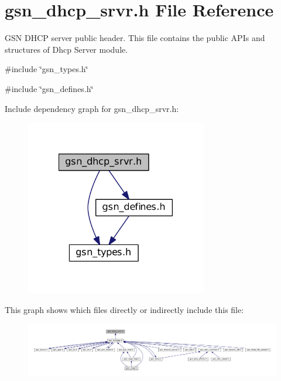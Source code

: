 \hypertarget{a00482}{
\section{gsn\_\-dhcp\_\-srvr.h File Reference}
\label{a00482}
}


GSN DHCP server public header. This file contains the public APIs and structures of Dhcp Server module.  


{\ttfamily \#include \char`\"{}gsn\_\-types.h\char`\"{}}\par
{\ttfamily \#include \char`\"{}gsn\_\-defines.h\char`\"{}}\par
Include dependency graph for gsn\_\-dhcp\_\-srvr.h:
\nopagebreak
\begin{figure}[H]
\begin{center}
\leavevmode
\includegraphics[width=225pt]{a00710}
\end{center}
\end{figure}
This graph shows which files directly or indirectly include this file:
\nopagebreak
\begin{figure}[H]
\begin{center}
\leavevmode
\includegraphics[width=400pt]{a00711}
\end{center}
\end{figure}
